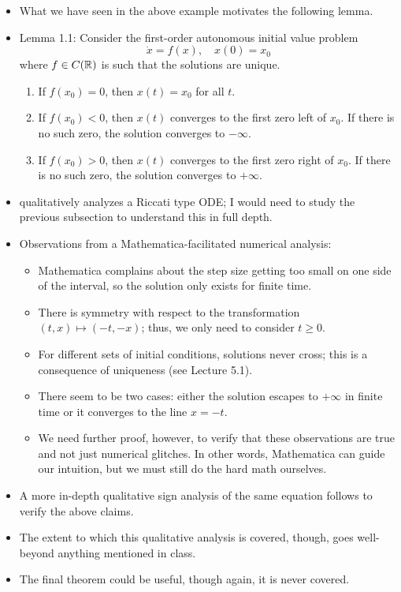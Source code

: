 \documentclass[../notes.tex]{subfiles}
\begin{document}
\begin{itemize}
\begin{itemize}
\begin{itemize}
        \end{itemize}
    \end{itemize}
    \item What we have seen in the above example motivates the following lemma.
    \item Lemma 1.1: Consider the first-order autonomous initial value problem
    \begin{equation*}
        \dot{x} = f(x)
        ,\quad
        x(0) = x_0
    \end{equation*}
    where $f\in C(\mathbb{R})$ is such that the solutions are unique.
    \begin{enumerate}
        \item If $f(x_0)=0$, then $x(t)=x_0$ for all $t$.
        \item If $f(x_0)<0$, then $x(t)$ converges to the first zero left of $x_0$. If there is no such zero, the solution converges to $-\infty$.
        \item If $f(x_0)>0$, then $x(t)$ converges to the first zero right of $x_0$. If there is no such zero, the solution converges to $+\infty$.
    \end{enumerate}
    \item \textcite{bib:Teschl} qualitatively analyzes a Riccati type ODE; I would need to study the previous subsection to understand this in full depth.
    \item Observations from a Mathematica-facilitated numerical analysis:
    \begin{itemize}
        \item Mathematica complains about the step size getting too small on one side of the interval, so the solution only exists for finite time.
        \item There is symmetry with respect to the transformation $(t,x)\mapsto(-t,-x)$; thus, we only need to consider $t\geq 0$.
        \item For different sets of initial conditions, solutions never cross; this is a consequence of uniqueness (see Lecture 5.1).
        \item There seem to be two cases: either the solution escapes to $+\infty$ in finite time or it converges to the line $x=-t$.
        \item We need further proof, however, to verify that these observations are true and not just numerical glitches. In other words, Mathematica can guide our intuition, but we must still do the hard math ourselves.
    \end{itemize}
    \item A more in-depth qualitative sign analysis of the same equation follows to verify the above claims.
    \item The extent to which this qualitative analysis is covered, though, goes well-beyond anything mentioned in class.
    \item The final theorem could be useful, though again, it is never covered.
\end{itemize}
\end{document}
